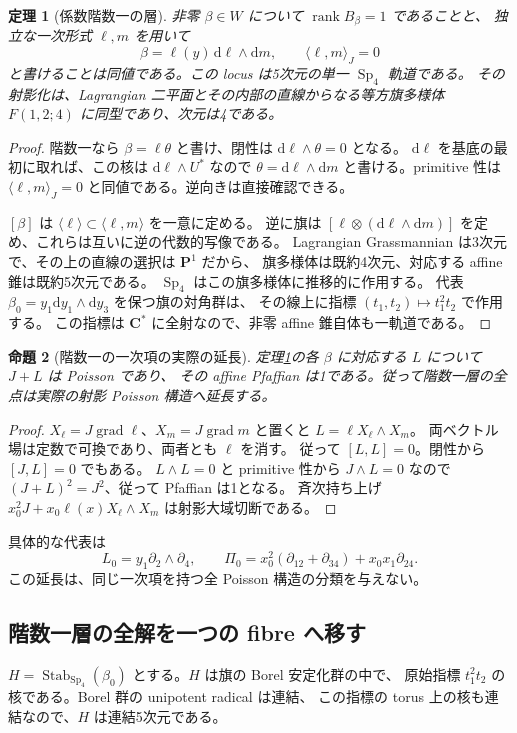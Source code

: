 \documentclass[11pt,a4paper]{ltjsarticle}
\newcommand{\CC}{\mathbf C}
\newcommand{\PP}{\mathbf P}
\newcommand{\dd}{\mathrm d}
\DeclareMathOperator{\Sp}{Sp}
\DeclareMathOperator{\rank}{rank}
\DeclareMathOperator{\Stab}{Stab}
\DeclareMathOperator{\grad}{grad}
\newtheorem{theorem}{定理}[section]
\newtheorem{proposition}[theorem]{命題}
\theoremstyle{remark}
\begin{document}
\begin{theorem}[係数階数一の層]\label{thm:rankone}
非零 $\beta\in W$ について $\rank B_\beta=1$ であることと、
独立な一次形式 $\ell,m$ を用いて
\[
 \beta=\ell(y)\,\dd\ell\wedge\dd m,
 \qquad\langle\ell,m\rangle_J=0
\]
と書けることは同値である。この locus は5次元の単一 $\Sp_4$ 軌道である。
その射影化は、Lagrangian 二平面とその内部の直線からなる等方旗多様体
$F(1,2;4)$ に同型であり、次元は4である。
\end{theorem}
\begin{proof}
階数一なら $\beta=\ell\theta$ と書け、閉性は $\dd\ell\wedge\theta=0$ となる。
$\dd\ell$ を基底の最初に取れば、この核は $\dd\ell\wedge U^*$ なので
$\theta=\dd\ell\wedge\dd m$ と書ける。primitive 性は
$\langle\ell,m\rangle_J=0$ と同値である。逆向きは直接確認できる。

$[\beta]$ は $\langle\ell\rangle\subset\langle\ell,m\rangle$ を一意に定める。
逆に旗は $[\ell\otimes(\dd\ell\wedge\dd m)]$ を定め、これらは互いに逆の代数的写像である。
Lagrangian Grassmannian は3次元で、その上の直線の選択は $\PP^1$ だから、
旗多様体は既約4次元、対応する affine 錐は既約5次元である。
$\Sp_4$ はこの旗多様体に推移的に作用する。
代表 $\beta_0=y_1\dd y_1\wedge\dd y_3$ を保つ旗の対角群は、
その線上に指標 $(t_1,t_2)\mapsto t_1^2t_2$ で作用する。
この指標は $\CC^*$ に全射なので、非零 affine 錐自体も一軌道である。
\end{proof}

\begin{proposition}[階数一の一次項の実際の延長]\label{prop:extension}
定理\ref{thm:rankone}の各 $\beta$ に対応する $L$ について $J+L$ は Poisson であり、
その affine Pfaffian は1である。従って階数一層の全点は実際の射影 Poisson 構造へ延長する。
\end{proposition}
\begin{proof}
$X_\ell=J\grad\ell$、$X_m=J\grad m$ と置くと
$L=\ell X_\ell\wedge X_m$。
両ベクトル場は定数で可換であり、両者とも $\ell$ を消す。
従って $[L,L]=0$。閉性から $[J,L]=0$ でもある。
$L\wedge L=0$ と primitive 性から $J\wedge L=0$ なので
$(J+L)^2=J^2$、従って Pfaffian は1となる。
斉次持ち上げ $x_0^2J+x_0\ell(x)X_\ell\wedge X_m$ は射影大域切断である。
\end{proof}

具体的な代表は
\[
 L_0=y_1\partial_2\wedge\partial_4,\qquad
 \Pi_0=x_0^2(\partial_{12}+\partial_{34})+x_0x_1\partial_{24}.
\]
この延長は、同じ一次項を持つ全 Poisson 構造の分類を与えない。

\subsection{階数一層の全解を一つの fibre へ移す}
$H=\Stab_{\Sp_4}(\beta_0)$ とする。$H$ は旗の Borel 安定化群の中で、
原始指標 $t_1^2t_2$ の核である。Borel 群の unipotent radical は連結、
この指標の torus 上の核も連結なので、$H$ は連結5次元である。
\end{document}
